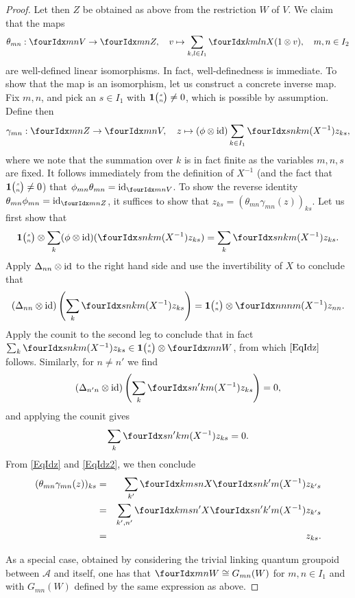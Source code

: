 \begin{proof}
Let then $Z$ be obtained as above from the restriction $W$ of $V$. We claim that the maps \[\theta_{mn}:\Gru{V}{m}{n}\rightarrow \Gru{Z}{m}{n},\quad v \mapsto \sum_{k,l\in I_1} \Gr{X}{k}{l}{m}{n}(1\otimes v),\quad m,n\in I_2\]  are well-defined linear isomorphisms. In fact, well-definedness is immediate. To show that the map is an isomorphism, let us construct a concrete inverse map. Fix $m,n$, and pick an $s\in I_1$ with $\mathbf{1}{\tiny {\begin{pmatrix} s\\n\end{pmatrix}}}\neq 0$, which is possible by assumption. Define then \[\gamma_{mn}:\Gru{Z}{m}{n} \rightarrow \Gru{V}{m}{n},\quad z \mapsto (\phi\otimes \id)\sum_{k\in I_1} \Gr{(X^{-1})}{s}{k}{n}{m}z_{ks},\] where we note that the summation over $k$ is in fact finite as the variables $m,n,s$ are fixed. It follows immediately from the definition of $X^{-1}$ (and the fact that $\mathbf{1}{\tiny {\begin{pmatrix} s\\n\end{pmatrix}}}\neq 0$) that $\phi_{mn}\theta_{mn} = \id_{\Gru{V}{m}{n}}$. To show the reverse identity $\theta_{mn}\phi_{mn} = \id_{\Gru{Z}{m}{n}}$, it suffices to show that $z_{ks} = (\theta_{mn}\gamma_{mn}(z))_{ks}$. Let us first show that \begin{equation}\label{EqIdz} \UnitC{s}{n}\otimes \sum_k (\phi\otimes \id)(\Gr{(X^{-1})}{s}{k}{n}{m}z_{ks}) = \sum_k \Gr{(X^{-1})}{s}{k}{n}{m}z_{ks}.\end{equation} Apply $\Delta_{nn}\otimes \operatorname{id}$ to the right hand side and use the invertibility of $X$ to conclude that  \[(\Delta_{nn}\otimes \id)\left(\sum_k \Gr{(X^{-1})}{s}{k}{n}{m}z_{ks}\right) = \UnitC{s}{n}\otimes \Gr{(X^{-1})}{n}{n}{n}{m}z_{nn}.\] Apply the counit to the second leg to conclude that in fact $\sum_k \Gr{(X^{-1})}{s}{k}{n}{m}z_{ks} \in \UnitC{s}{n} \otimes \Gru{W}{m}{n}$, from which $\eqref{EqIdz}$ follows. Similarly, for $n\neq n'$ we find  \[(\Delta_{n'n}\otimes \id)\left(\sum_k \Gr{(X^{-1})}{s}{k}{n'}{m}z_{ks}\right) =0,\] and applying the counit gives \begin{equation}\label{EqIdz2} \sum_k \Gr{(X^{-1})}{s}{k}{n'}{m}z_{ks} =0.\end{equation} From \eqref{EqIdz} and \eqref{EqIdz2}, we then conclude 
\begin{eqnarray*} (\theta_{mn}\gamma_{mn}(z))_{ks} &=& \sum_{k'} \Gr{X}{k}{s}{m}{n}\Gr{(X^{-1})}{s}{k'}{n}{m}z_{k's} \\ &=& \sum_{k',n'} \Gr{X}{k}{s}{m}{n'}\Gr{(X^{-1})}{s}{k'}{n'}{m}z_{k's} \\ &=& z_{ks}.\end{eqnarray*} 

As a special case, obtained by considering the trivial linking quantum groupoid between $\mathscr{A}$ and itself, one has that $\Gru{W}{m}{n}\cong G_{mn}(W)$ for $m,n\in I_1$ and with $G_{mn}(W)$ defined by the same expression as above.


\end{proof}
